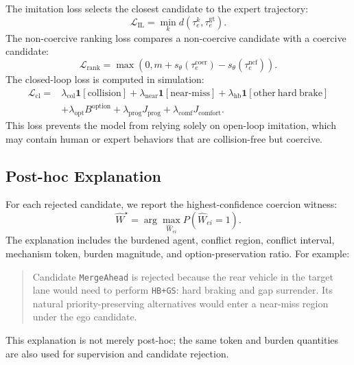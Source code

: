 \documentclass[10pt]{article}
\begin{document}
The imitation loss selects the closest candidate to the expert trajectory:
\begin{equation}
    \mathcal{L}_{\mathrm{IL}}
    =
    \min_k
    d(\tau^k_e,\tau^{\mathrm{gt}}_e).
\end{equation}
The non-coercive ranking loss compares a non-coercive candidate with a coercive candidate:
\begin{equation}
    \mathcal{L}_{\mathrm{rank}}
    =
    \max
    \left(
    0,
    m
    +
    s_\theta(\tau^{\mathrm{coer}}_e)
    -
    s_\theta(\tau^{\mathrm{ncf}}_e)
    \right).
\end{equation}
The closed-loop loss is computed in simulation:
\begin{equation}
\begin{aligned}
    \mathcal{L}_{\mathrm{cl}}
    =
    &
    \lambda_{\mathrm{col}}\mathbf{1}[\mathrm{collision}]
    +
    \lambda_{\mathrm{near}}\mathbf{1}[\mathrm{near\text{-}miss}]
    +
    \lambda_{\mathrm{hb}}\mathbf{1}[\mathrm{other\ hard\ brake}]\\
    &
    +
    \lambda_{\mathrm{opt}} B^{\mathrm{option}}
    +
    \lambda_{\mathrm{prog}}J_{\mathrm{prog}}
    +
    \lambda_{\mathrm{comf}}J_{\mathrm{comfort}} .
\end{aligned}
\end{equation}
This loss prevents the model from relying solely on open-loop imitation, which may contain human or expert behaviors that are collision-free but coercive.

\subsection{Post-hoc Explanation}
\label{app:explanation}

For each rejected candidate, we report the highest-confidence coercion witness:
\begin{equation}
    \widehat{W}^{\star}
    =
    \arg\max_{\widehat{W}_{ei}}
    P(\widehat{W}_{ei}=1).
\end{equation}
The explanation includes the burdened agent, conflict region, conflict interval, mechanism token, burden magnitude, and option-preservation ratio. For example:
\begin{quote}
    Candidate \texttt{MergeAhead} is rejected because the rear vehicle in the target lane would need to perform \texttt{HB+GS}: hard braking and gap surrender. Its natural priority-preserving alternatives would enter a near-miss region under the ego candidate.
\end{quote}
This explanation is not merely post-hoc; the same token and burden quantities are also used for supervision and candidate rejection.

\printbibliography
\end{document}
